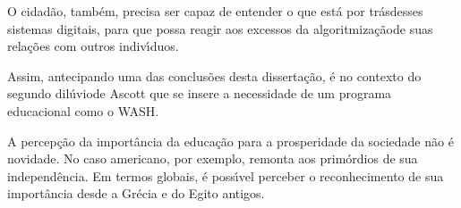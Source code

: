 \documentclass[
12pt,		%
openright,	%
twoside,  %
a4paper,			%
chapter=TITLE,		%
english,			%
french,				%
spanish,			%
brazil				%
]{USPSC-classe/USPSC}
\begin{document}
O cidad\~ao, tamb\'em, precisa ser capaz de entender \textquotedbl o que est\'a por tr\'as\textquotedbl  desses sistemas digitais, para que possa reagir aos excessos da \textquotedbl algoritmiza\c{c}\~ao\textquotedbl  de suas rela\c{c}\~oes com outros indiv\'{\i}duos.

















Assim, antecipando  uma das conclus\~oes desta disserta\c{c}\~ao, \'e no contexto do \textquotedbl segundo dil\'uvio\textquotedbl  de Ascott que se insere a necessidade de um programa educacional como o WASH.

















A percep\c{c}\~ao da import\^ancia da educa\c{c}\~ao para a prosperidade da sociedade n\~ao \'e novidade. No caso americano, por exemplo, remonta aos prim\'ordios de sua independ\^encia. Em termos globais, \'e poss\'{\i}vel perceber o reconhecimento de sua import\^ancia desde a Gr\'ecia e do Egito antigos.
\end{document}
